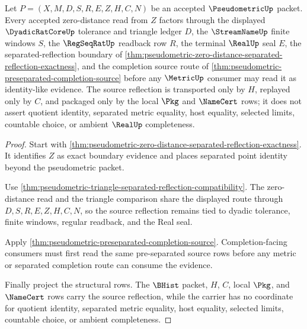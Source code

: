 \begin{theorem}
\label{thm:pseudometric-zero-distance-source-reflection}
Let $P=(X,M,D,S,R,E,Z,H,C,N)$ be an accepted $\PseudometricUp$ packet. Every accepted zero-distance read from $Z$ factors through the displayed $\DyadicRatCoreUp$ tolerance and triangle ledger $D$, the $\StreamNameUp$ finite windows $S$, the $\RegSeqRatUp$ readback row $R$, the terminal $\RealUp$ seal $E$, the separated-reflection boundary of \autoref{thm:pseudometric-zero-distance-separated-reflection-exactness}, and the completion source route of \autoref{thm:pseudometric-preseparated-completion-source} before any $\MetricUp$ consumer may read it as identity-like evidence. The source reflection is transported only by $H$, replayed only by $C$, and packaged only by the local $\Pkg$ and $\NameCert$ rows; it does not assert quotient identity, separated metric equality, host equality, selected limits, countable choice, or ambient $\RealUp$ completeness.
\end{theorem}
\begin{proof}
Start with \autoref{thm:pseudometric-zero-distance-separated-reflection-exactness}. It identifies $Z$ as exact boundary evidence and places separated point identity beyond the pseudometric packet.

Use \autoref{thm:pseudometric-triangle-separated-reflection-compatibility}. The zero-distance read and the triangle comparison share the displayed route through $D,S,R,E,Z,H,C,N$, so the source reflection remains tied to dyadic tolerance, finite windows, regular readback, and the Real seal.

Apply \autoref{thm:pseudometric-preseparated-completion-source}. Completion-facing consumers must first read the same pre-separated source rows before any metric or separated completion route can consume the evidence.

Finally project the structural rows. The $\BHist$ packet, $H$, $C$, local $\Pkg$, and $\NameCert$ rows carry the source reflection, while the carrier has no coordinate for quotient identity, separated metric equality, host equality, selected limits, countable choice, or ambient completeness.
\end{proof}

